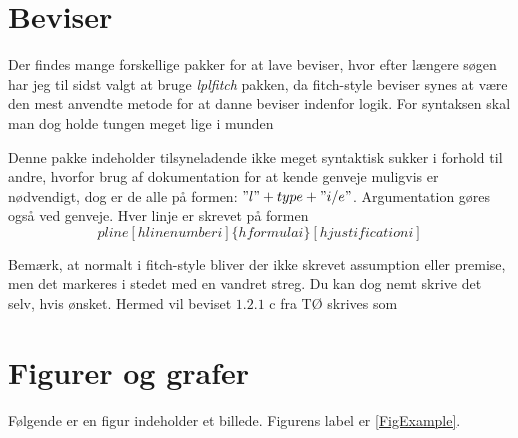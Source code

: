 \documentclass[a4, danish]{article}
\begin{document}
\section{Beviser}
Der findes mange forskellige pakker for at lave beviser, hvor efter længere søgen har jeg til sidst valgt at bruge \emph{lplfitch} pakken, da fitch-style beviser synes at være den mest anvendte metode for at danne beviser indenfor logik. For syntaksen skal man dog holde tungen meget lige i munden
\begin{center}
\end{center}

Denne pakke indeholder tilsyneladende ikke meget syntaktisk sukker i forhold til andre, hvorfor brug af dokumentation for at kende genveje muligvis er nødvendigt, dog er de alle på formen: $"l" + type + "i/e"$. Argumentation gøres også ved genveje. Hver linje er skrevet på formen
\begin{equation*}
    pline[hline number i]\{hformulai\}[hjustificationi]
\end{equation*}

\newpage
Bemærk, at normalt i fitch-style bliver der ikke skrevet assumption eller premise, men det markeres i stedet med en vandret streg. Du kan dog nemt skrive det selv, hvis ønsket. Hermed vil beviset $1.2.1$ c fra TØ skrives som
\begin{center}
\end{center}

\section{Figurer og grafer}
Følgende er en figur indeholder et billede. Figurens label er \ref{FigExample}.
\end{document}
